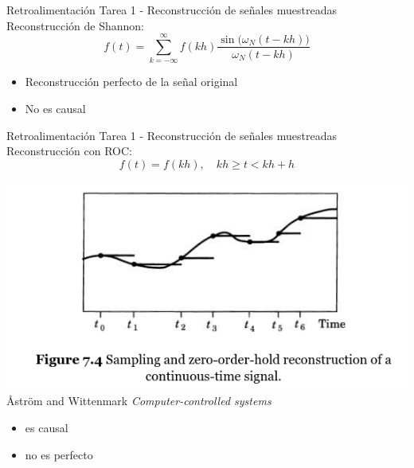 \documentclass[presentation,aspectratio=1610]{beamer}
\begin{document}
\begin{frame}[label={sec:org6e7b8ae}]{Retroalimentación Tarea 1 - Reconstrucción de señales muestreadas}
Reconstrucción de Shannon:
\[ f(t) = \sum_{k=-\infty}^\infty f(kh) \frac{\sin\big(\omega_N(t-kh)\big)}{\omega_N(t-kh)}\]

\begin{itemize}
\item Reconstrucción perfecto de la señal original
\item \alert{No es causal}
\end{itemize}
\end{frame}

\begin{frame}[label={sec:orgbab4008}]{Retroalimentación Tarea 1 - Reconstrucción de señales muestreadas}
Reconstrucción con ROC:
\[ f(t) = f(kh), \quad kh \ge t < kh+h\]
\begin{center}
\includegraphics[width=0.6\linewidth]{../../figures/fig7-4.png}\\
{\tiny Åström and Wittenmark \emph{Computer-controlled systems}}
\end{center}

\begin{itemize}
\item \alert{es causal}
\item no es perfecto
\end{itemize}
\end{frame}
\end{document}
